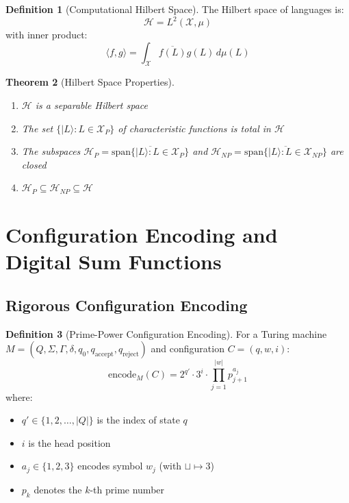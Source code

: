 \documentclass[12pt]{article}
\theoremstyle{plain}
\newtheorem{theorem}{Theorem}[section]
\theoremstyle{definition}
\newtheorem{definition}[theorem]{Definition}
\newcommand{\encode}{\text{encode}}
\begin{document}
\begin{definition}[Computational Hilbert Space]
The Hilbert space of languages is:
\begin{equation}
\mathcal{H} = L^2(\mathcal{X}, \mu)
\end{equation}
with inner product:
\begin{equation}
\langle f, g \rangle = \int_{\mathcal{X}} \overline{f(L)} g(L) \, d\mu(L)
\end{equation}
\end{definition}

\begin{theorem}[Hilbert Space Properties]
\label{thm:hilbert}
\begin{enumerate}
\item $\mathcal{H}$ is a separable Hilbert space
\item The set $\{|L\rangle : L \in \mathcal{X}_P\}$ of characteristic functions is total in $\mathcal{H}$
\item The subspaces $\mathcal{H}_P = \overline{\text{span}\{|L\rangle : L \in \mathcal{X}_P\}}$ and $\mathcal{H}_{NP} = \overline{\text{span}\{|L\rangle : L \in \mathcal{X}_{NP}\}}$ are closed
\item $\mathcal{H}_P \subseteq \mathcal{H}_{NP} \subseteq \mathcal{H}$
\end{enumerate}
\end{theorem}

\section{Configuration Encoding and Digital Sum Functions}

\subsection{Rigorous Configuration Encoding}

\begin{definition}[Prime-Power Configuration Encoding]
\label{def:config_encode}
For a Turing machine $M = (Q, \Sigma, \Gamma, \delta, q_0, q_{\text{accept}}, q_{\text{reject}})$ and configuration $C = (q, w, i)$:
\begin{equation}
\encode_M(C) = 2^{q'} \cdot 3^{i} \cdot \prod_{j=1}^{|w|} p_{j+1}^{a_j}
\end{equation}
where:
\begin{itemize}
\item $q' \in \{1, 2, \ldots, |Q|\}$ is the index of state $q$
\item $i$ is the head position
\item $a_j \in \{1, 2, 3\}$ encodes symbol $w_j$ (with $\sqcup \mapsto 3$)
\item $p_k$ denotes the $k$-th prime number
\end{itemize}
\end{definition}
\end{document}

